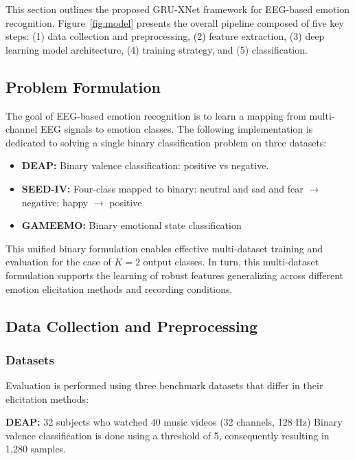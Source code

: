 \documentclass[conference]{IEEEtran}
\begin{document}

This section outlines the proposed GRU-XNet framework for EEG-based emotion recognition. Figure~\ref{fig:model} presents the overall pipeline composed of five key steps: (1) data collection and preprocessing, (2) feature extraction, (3) deep learning model architecture, (4) training strategy, and (5) classification.

\subsection{Problem Formulation}

The goal of EEG-based emotion recognition is to learn a mapping from multi-channel EEG signals to emotion classes. The following implementation is dedicated to solving a single binary classification problem on three datasets:
\begin{itemize}
    \item \textbf{DEAP:} Binary valence classification: positive vs negative.
    \item \textbf{SEED-IV:} Four-class mapped to binary: neutral and sad and fear $\rightarrow$ negative; happy $\rightarrow$ positive
    \item \textbf{GAMEEMO:} Binary emotional state classification
\end{itemize}

This unified binary formulation enables effective multi-dataset training and evaluation for the case of $K = 2$ output classes. In turn, this multi-dataset formulation supports the learning of robust features generalizing across different emotion elicitation methods and recording conditions.

\subsection{Data Collection and Preprocessing}


\subsubsection{Datasets}

Evaluation is performed using three benchmark datasets that differ in their elicitation methods:

\textbf{DEAP:} 32 subjects who watched 40 music videos (32 channels, 128 Hz) Binary valence classification is done using a threshold of 5, consequently resulting in 1,280 samples.
\end{document}
